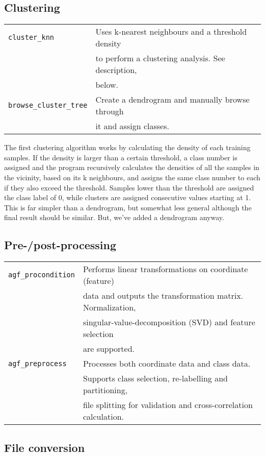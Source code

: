 \documentclass[12pt]{article}
\begin{document}
\subsection{Clustering}

\begin{tabular}{ll}
  \verb/cluster_knn/ & Uses k-nearest neighbours and a threshold density\\
		     & to perform a clustering analysis.  See description, \\
	      & below.\\
  \verb/browse_cluster_tree/ &Create a dendrogram and manually browse through\\
		    & it and assign classes.
\end{tabular}

  The first clustering algorithm works by calculating the density of each training samples.  If the density is larger than a certain threshold, a class number is assigned and the program recursively calculates the densities of all the samples in the vicinity, based on its k neighbours, and assigns the same class number to each if they also exceed the threshold.  Samples lower than the threshold are assigned the class label of 0, while clusters are assigned consecutive values starting at 1.  This is far simpler than a dendrogram, but somewhat less general although the final result should be similar.  But, we've added a dendrogram anyway.

\subsection{Pre-/post-processing}

\begin{tabular}{ll}
\verb/agf_procondition/ & Performs linear transformations on coordinate (feature)\\
 & data and outputs the transformation matrix.  Normalization, \\
 & singular-value-decomposition (SVD) and feature selection \\
 & are supported.\\
\verb/agf_preprocess/ & Processes both coordinate data and class data.  \\
 & Supports class selection, re-labelling and partitioning, \\
 & file splitting for validation and cross-correlation calculation.
\end{tabular}

\subsection{File conversion}
\end{document}
